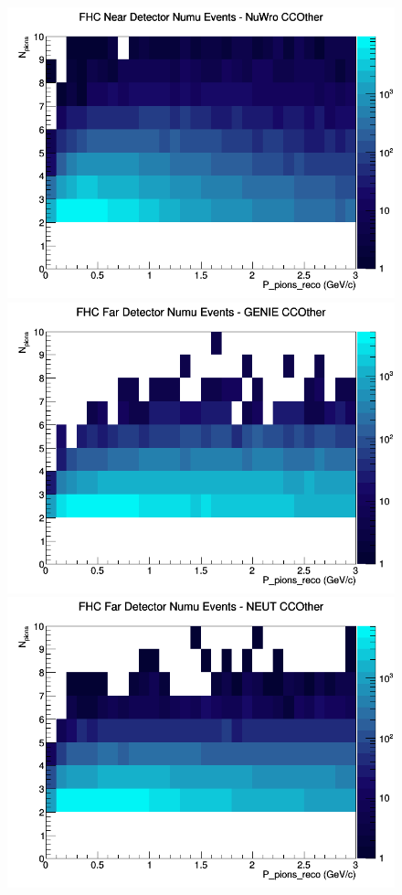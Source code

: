 \documentclass[12pt]{article}
\begin{document}
\begin{figure}[h]
\includegraphics[width=\linewidth]{eff_N_P/LAr/pions/CCOther_FHC_ND_numu_N_P_NuWro.png}
\endminipage
\newline
{}
\includegraphics[width=\linewidth]{eff_N_P/LAr/pions/CCOther_FHC_FD_numu_N_P_GENIE.png}
\endminipage
{}
\includegraphics[width=\linewidth]{eff_N_P/LAr/pions/CCOther_FHC_FD_numu_N_P_NEUT.png}

\end{figure}
\end{document}
